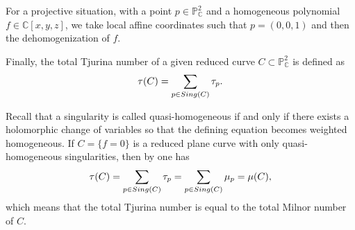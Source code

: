 \documentclass[12pt]{article}
\theoremstyle{plain}
\theoremstyle{definition}
\begin{document}
For a projective situation, with a point $p\in \mathbb{P}^{2}_{\mathbb{C}}$ and a homogeneous polynomial $f\in \mathbb{C}[x,y,z]$, we take local affine coordinates such that $p=(0,0,1)$ and then the dehomogenization of $f$.

Finally, the total Tjurina number of a given reduced curve $C \subset \mathbb{P}^{2}_{\mathbb{C}}$ is defined as
$$\tau(C) = \sum_{p \in {\rm Sing}(C)} \tau_{p}.$$ 

Recall that a singularity is called quasi-homogeneous if and only if there exists a holomorphic change of variables so that the defining equation becomes weighted homogeneous. If $C = \{f=0\}$ is a reduced plane curve with only quasi-homogeneous singularities,  then by \cite[Satz]{KS} one has
$$\tau(C) = \sum_{p \in {\rm Sing}(C)} \tau_{p} = \sum_{p \in {\rm Sing}(C)} \mu_{p} = \mu(C),$$
which means that the total Tjurina number is equal to the total Milnor number of $C$.
\end{document}
